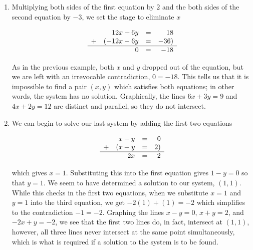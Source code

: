 \documentclass{ximera}
\begin{document}
\begin{example}
\begin{enumerate}
\begin{center}
\begin{tabular}{m{.5in}m{2in}m{.5in}m{2in}}
\\

\end{tabular}

\end{center}

\item  Multiplying both sides of the first equation by $2$ and the both sides of the second equation by $-3$, we set the stage to eliminate $x$ 

\setlength{\extrarowheight}{2pt}
\[ \begin{array}{lrcr} & 12x + 6y & = & 18  \\ + & (-12x-6y  & = & -36 ) \\ \hline  & 0 & = & -18 \end{array}\] 
\setlength{\extrarowheight}{0pt}

As in the previous example, both $x$ and $y$ dropped out of the equation, but we are left with an irrevocable contradiction, $0 = -18$. This tells us that it is impossible to find a pair $(x,y)$ which satisfies both equations; in other words, the system has no solution.  Graphically, the lines  $6x + 3y =9$ and  $4x + 2y = 12$ are distinct and parallel, so they do not intersect.

\item  We can begin to solve our last system by adding the first two equations  

\setlength{\extrarowheight}{2pt}
\[ \begin{array}{lrcr} & x - y & = & 0  \\ + & (x + y & = & 2 ) \\ \hline  & 2x & = & 2 \end{array}\]  
\setlength{\extrarowheight}{0pt}

which gives $x = 1$.  Substituting this into the first equation gives $1 - y = 0$ so that $y = 1$.  We seem to have determined a solution to our system, $(1,1)$.  While this checks in the first two equations, when we substitute $x=1$ and $y=1$ into the third equation, we get $-2(1) + (1) = -2$ which simplifies to the contradiction $-1 = -2$.  Graphing the lines $x-y=0$, $x+y = 2$, and $-2x+y=-2$, we see that the first two lines do, in fact, intersect at $(1,1)$, however, all three lines never intersect at the same point simultaneously, which is what is required if a solution to the system is to be found.

\begin{center}

\begin{tabular}{m{.5in}m{2in}m{.5in}m{2in}}


\end{tabular}
\end{center}
\end{enumerate}
\end{example}
\end{document}
